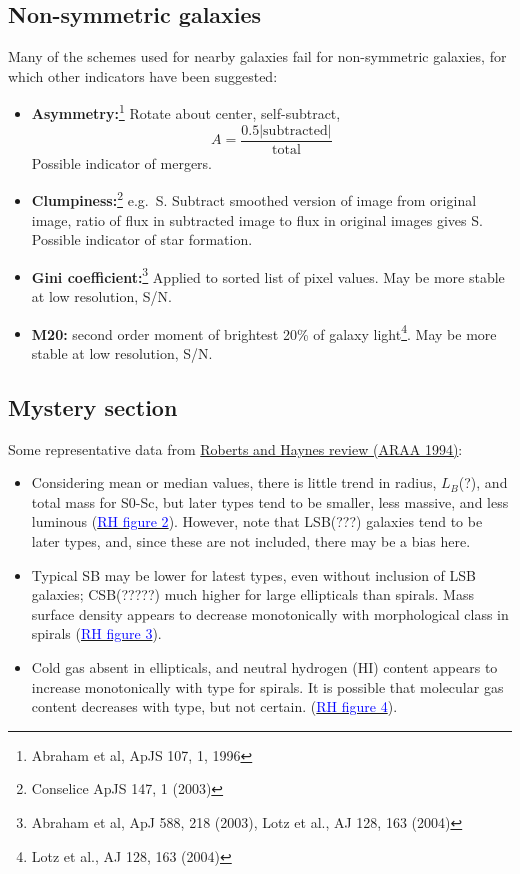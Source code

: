 \documentclass{article}
\begin{document}
\subsection{Non-symmetric galaxies}
Many of the schemes used for nearby galaxies fail for non-symmetric galaxies,
for which other indicators have been suggested:
\begin{itemize}
    \item \textbf{Asymmetry:}\footnote{Abraham et al, ApJS 107, 1, 1996}
        Rotate about center, self-subtract,
        \[
            A = \frac{0.5\vert\mathrm{subtracted}\vert}{\mathrm{total}}
        \]
        Possible indicator of mergers.
    \item \textbf{Clumpiness:}\footnote{
        Conselice ApJS 147, 1 (2003)} e.g.\ S.  Subtract smoothed version of
        image from original image, ratio of flux in subtracted image to flux in
        original images gives S.  Possible indicator of star formation.
    \item \textbf{Gini coefficient:}\footnote{
        Abraham et al, ApJ 588, 218 (2003), Lotz et al., AJ 128, 163 (2004)}
        Applied to sorted list of pixel values. May be more stable at low
        resolution, S/N.
    \item \textbf{M20:} second order moment of brightest 20\% of
        galaxy light\footnote{Lotz et al., AJ 128, 163 (2004)}.
        May be more stable at low resolution, S/N.
\end{itemize}

\subsection{Mystery section}
Some representative data from
\href{http://adsabs.harvard.edu/cgi-bin/nph-bib_query?bibcode=1994ARA\%26A..32..115}
{Roberts and Haynes review (ARAA 1994)}:
\begin{itemize}
    \item Considering mean or median values, there is little trend in
        radius, $L_B$(?), and total mass for S0-Sc, but later types tend
        to be smaller, less massive, and less luminous
        (\href{http://astronomy.nmsu.edu/holtz/a555/html/diagrams/a616/rh2.htm}
        {\textcolor{blue}{RH figure 2}}).
        However, note that LSB(???) galaxies tend to be later types, and,
        since these are not included, there may be a bias here.
    \item Typical SB may be lower for latest types, even without inclusion
        of LSB galaxies; CSB(?????) much higher for large ellipticals than
        spirals. Mass surface density appears to decrease monotonically with
        morphological class in spirals
        (\href{http://astronomy.nmsu.edu/holtz/a555/html/diagrams/a616/rh3.htm}
        {\textcolor{blue}{RH figure 3}}).
    \item Cold gas absent in ellipticals, and neutral hydrogen (HI) content
        appears to increase monotonically with type for spirals. It is possible
        that molecular gas content decreases with type, but not certain.
        (\href{http://astronomy.nmsu.edu/holtz/a555/html/diagrams/a616/rh4.htm}
        {\textcolor{blue}{RH figure 4}}).
\end{itemize}
\end{document}
